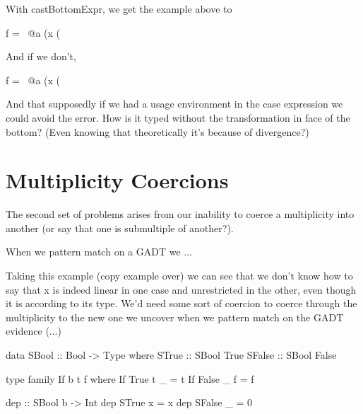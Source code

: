 \documentclass[a4paper, draft]{article}
\begin{document}
\begin{code}
With castBottomExpr, we get the example above to
\begin{code}
    f = \ @a (x (%
\end{code}
And if we don't, 
\begin{code}
    f = \ @a (x (%
\end{code}
And that supposedly if we had a usage environment in the case expression we
could avoid the error. How is it typed without the transformation in face
of the bottom? (Even knowing that theoretically it's because of divergence?)



\section{Multiplicity Coercions}

The second set of problems arises from our inability to coerce a multiplicity
into another (or say that one is submultiple of another?).

When we pattern match on a GADT we ...

Taking this example (copy example over) we can see that we don't know how to say
that x is indeed linear in one case and unrestricted in the other, even though
it is according to its type. We'd need some sort of coercion to coerce through
the multiplicity to the new one we uncover when we pattern match on the GADT
evidence (...)

\begin{code}
data SBool :: Bool -> Type where
  STrue :: SBool True
  SFalse :: SBool False

type family If b t f where
  If True t _ = t
  If False _ f = f

dep :: SBool b -> Int %
dep STrue x = x
dep SFalse _ = 0
\end{code}







\end{code}
\end{document}

